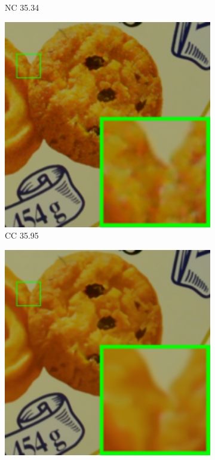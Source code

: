 \begin{figure}
\begin{subfigure}[t]{0.19\textwidth}
		\caption{NC 35.34}
    \end{subfigure}
    \hfill
    \begin{subfigure}[t]{0.19\textwidth}
        \centering
        \includegraphics[width=1\textwidth]{images/mcwnnm/cc/resize_br_CC_d600_iso3200_2.png}
		\caption{CC 35.95}
    \end{subfigure}
    \hfill
    \begin{subfigure}[t]{0.19\textwidth}
        \centering
        \includegraphics[width=1\textwidth]{images/mcwnnm/cc/resize_br_WNNMJ_CC15_d600_iso3200_2.png}

\end{subfigure}
\end{figure}
